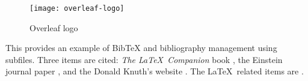 \documentclass[../computer-history.tex]{subfiles}
\begin{document}
\begin{figure}[bh]
\centering
\texttt{[image: overleaf-logo]}

\label{fig:img1}
\caption{Overleaf logo}
\end{figure}

This provides an example of BibTeX and bibliography management using subfiles. Three items are cited: \textit{The \LaTeX\ Companion} book \cite{latexcompanion}, the Einstein journal paper \cite{einstein}, and the Donald Knuth's website \cite{knuthwebsite}. The \LaTeX\ related items are \cite{latexcompanion,knuthwebsite}.



\end{document}
